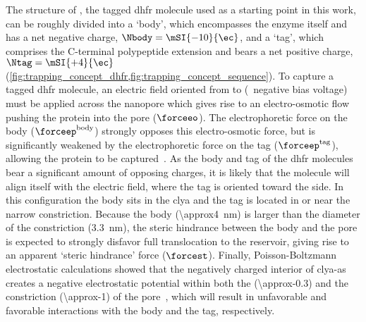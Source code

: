 The structure of , the tagged \gls{dhfr} molecule used as a starting point in this work, can be
roughly divided into a `body', which encompasses the enzyme itself and has a net negative charge,
$\Nbody=\mSI{-10}{\ec}$, and a `tag', which comprises the C-terminal polypeptide extension and bears a net
positive charge, $\Ntag=\mSI{+4}{\ec}$ (\cref{fig:trapping_concept_dhfr,fig:trapping_concept_sequence}). To
capture a tagged \gls{dhfr} molecule, an electric field oriented from \cisi{} to \transi{} (\ie~negative bias
voltage) must be applied across the nanopore which gives rise to an electro-osmotic flow pushing the protein
into the pore ($\forceeo$). The electrophoretic force on the body ($\forceep^{\rm{body}}$) strongly opposes
this electro-osmotic force, but is significantly weakened by the electrophoretic force on the tag
($\forceep^{\rm{tag}}$), allowing the protein to be
captured~\cite{Soskine-2012,Soskine-Biesemans-2015,Biesemans-2015}. As the body and tag of the \gls{dhfr}
molecules bear a significant amount of opposing charges, it is likely that the molecule will align itself with
the electric field, where the tag is oriented toward the \transi{} side. In this configuration the body sits
in the \gls{clya} \lumen{} and the tag is located in or near the narrow constriction. Because the body
(\SI{\approx4}{\nm}) is larger than the diameter of the constriction (\SI{3.3}{\nm}), the steric hindrance
between the body and the pore is expected to strongly disfavor full translocation to the \transi{} reservoir,
giving rise to an apparent `steric hindrance' force ($\forcest$). Finally, Poisson-Boltzmann electrostatic
calculations showed that the negatively charged interior of \gls{clya-as} creates a negative electrostatic
potential within both the \lumen{} (\SI{\approx-0.3}{\kTe}) and the constriction (\SI{\approx-1}{\kTe}) of the
pore~\cite{Franceschini-2016}, which will result in unfavorable and favorable interactions with the body and
the tag, respectively.

